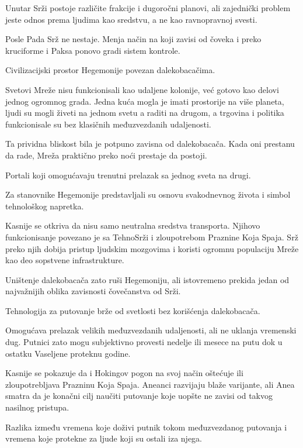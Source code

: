 \begin{description}
  Unutar Srži postoje različite frakcije i dugoročni planovi, ali zajednički problem jeste odnos prema ljudima kao sredstvu, a ne kao ravnopravnoj svesti.

  Posle Pada Srž ne nestaje. Menja način na koji zavisi od čoveka i preko kruciforme i Paksa ponovo gradi sistem kontrole.


  \item[Mreža]
  Civilizacijski prostor Hegemonije povezan dalekobacačima.

  Svetovi Mreže nisu funkcionisali kao udaljene kolonije, već gotovo kao delovi jednog ogromnog grada. Jedna kuća mogla je imati prostorije na više planeta, ljudi su mogli živeti na jednom svetu a raditi na drugom, a trgovina i politika funkcionisale su bez klasičnih međuzvezdanih udaljenosti.

  Ta prividna bliskost bila je potpuno zavisna od dalekobacača. Kada oni prestanu da rade, Mreža praktično preko noći prestaje da postoji.


  \item[Dalekobacači]
  Portali koji omogućavaju trenutni prelazak sa jednog sveta na drugi.

  Za stanovnike Hegemonije predstavljali su osnovu svakodnevnog života i simbol tehnološkog napretka.

  Kasnije se otkriva da nisu samo neutralna sredstva transporta. Njihovo funkcionisanje povezano je sa TehnoSrži i zloupotrebom Praznine Koja Spaja. Srž preko njih dobija pristup ljudskim mozgovima i koristi ogromnu populaciju Mreže kao deo sopstvene infrastrukture.

  Uništenje dalekobacača zato ruši Hegemoniju, ali istovremeno prekida jedan od najvažnijih oblika zavisnosti čovečanstva od Srži.


  \item[Hokingov pogon]
  Tehnologija za putovanje brže od svetlosti bez korišćenja dalekobacača.

  Omogućava prelazak velikih međuzvezdanih udaljenosti, ali ne uklanja vremenski dug. Putnici zato mogu subjektivno provesti nedelje ili mesece na putu dok u ostatku Vaseljene proteknu godine.

  Kasnije se pokazuje da i Hokingov pogon na svoj način oštećuje ili zloupotrebljava Prazninu Koja Spaja. Aneanci razvijaju blaže varijante, ali Anea smatra da je konačni cilj naučiti putovanje koje uopšte ne zavisi od takvog nasilnog pristupa.


  \item[Vremenski dug]
  Razlika između vremena koje doživi putnik tokom međuzvezdanog putovanja i vremena koje protekne za ljude koji su ostali iza njega.


\end{description}
